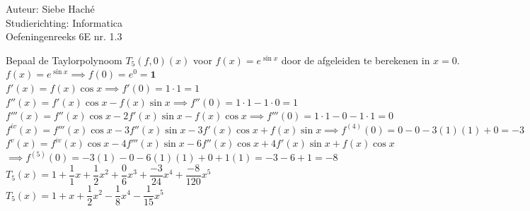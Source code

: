 \documentclass[a4paper]{article}
\begin{document}
\noindent \large Auteur: Siebe Haché \\
\noindent \large Studierichting: Informatica \\
\noindent \large Oefeningenreeks 6E nr. 1.3\\

\medskip
\normalsize

Bepaal de Taylorpolynoom $T_5(f,0)(x)$ voor $f(x) = e^{\sin x}$ door de afgeleiden te berekenen in $x=0$.\\

$f(x) = e^{\sin x} \implies f(0) = e^0 = \mathbf{1}$\\

$f'(x) = f(x) \cos x \implies f'(0) = 1 \cdot 1 = 1$\\

$f''(x) = f'(x) \cos x - f(x) \sin x \implies f''(0) = 1 \cdot 1 - 1 \cdot 0 =1$\\

$f'''(x) = f''(x) \cos x - 2f'(x) \sin x - f(x) \cos x \implies f'''(0) = 1 \cdot 1 - 0 - 1 \cdot 1 = 0$\\

$f^{iv}(x) = f'''(x) \cos x - 3f''(x) \sin x - 3f'(x) \cos x + f(x) \sin x \implies f^{(4)}(0) = 0 - 0 - 3(1)(1) + 0 = -3$\\

$f^{v}(x) = f^{iv}(x) \cos x - 4f'''(x) \sin x - 6f''(x) \cos x + 4f'(x) \sin x + f(x) \cos x$\\
    
$\implies f^{(5)}(0) = -3(1) - 0 - 6(1)(1) + 0 + 1(1) = -3 - 6 + 1 = -8$\\

$T_5(x) = 1 + \dfrac{1}{1}x + \dfrac{1}{2}x^2 + \dfrac{0}{6}x^3 + \dfrac{-3}{24}x^4 + \dfrac{-8}{120}x^5$ \\

$T_5(x) = 1 + x + \dfrac{1}{2}x^2 - \dfrac{1}{8}x^4 - \dfrac{1}{15}x^5$\\

\begin{thebibliography}{999}
\end{thebibliography}
\end{document}
